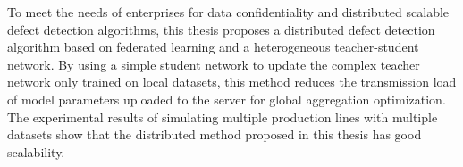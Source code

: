 \begin{abstractEn}
  To meet the needs of enterprises for data confidentiality and distributed scalable defect detection algorithms, this thesis proposes a distributed defect detection algorithm based on federated learning and a heterogeneous teacher-student network. By using a simple student network to update the complex teacher network only trained on local datasets, this method reduces the transmission load of model parameters uploaded to the server for global aggregation optimization. The experimental results of simulating multiple production lines with multiple datasets show that the distributed method proposed in this thesis has good scalability.
\end{abstractEn}
